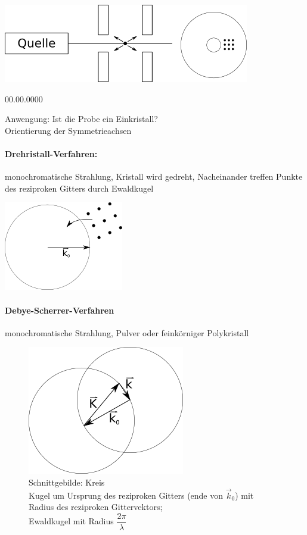 \includegraphics[scale=1]{images/2009-11-05-lane-verfahren.png}
\begin{labeling}{00.00.0000}
\item [{Anwengung:}] Ist die Probe ein Einkristall?\\
Orientierung der Symmetrieachsen
\end{labeling}

\paragraph{Drehristall-Verfahren:}

monochromatische Strahlung, Kristall wird gedreht, Nacheinander treffen
Punkte des reziproken Gitters durch Ewaldkugel

\includegraphics[scale=1]{images/2009-11-05-drehkristall-verfahren.png}


\paragraph{Debye-Scherrer-Verfahren}

monochromatische Strahlung, Pulver oder feink\"orniger Polykristall

\begin{figure}%

\caption[Schnittgebilde: Kreis]%
  {Schnittgebilde: Kreis\\
  Kugel um Ursprung des reziproken Gitters (ende von $\vec{k}_0$) mit Radius des reziproken Gittervektors; \\
  Ewaldkugel mit Radius $\dfrac{2\pi}{\lambda}$}

\includegraphics[scale=1]{images/2009-11-05-debye-scherrer-verfahren.png}

\end{figure}%


